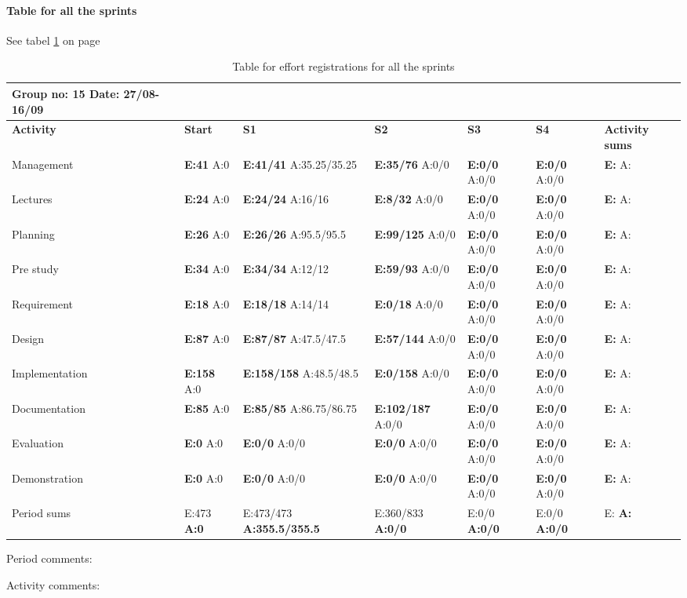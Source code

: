 \paragraph{Table for all the sprints}\hfill

See tabel \ref{tab:effortsprints} on page \pageref{tab:effortsprints}
\begin{table}
\begin{tabularx}{\linewidth}{>{\setlength\hsize{.55\hsize}}X|>{\setlength\hsize{0.2\hsize}}X|>{\setlength\hsize{0.4\hsize}}X|>{\setlength\hsize{0.3\hsize}}X|>{\setlength\hsize{0.3\hsize}}X|>{\setlength\hsize{.3\hsize}}X|>{\setlength\hsize{.2\hsize}}X}
Group no: 15 Date: 27/08-16/09 \\ \hline
\textbf{Activity} & \textbf{Start} & \textbf{S1} & \textbf{S2} & \textbf{S3} & \textbf{S4} & \textbf{Activity sums}\\ \hline \hline
Management & \textbf{E:41} A:0 & \textbf{E:41/41} A:35.25/35.25 & \textbf{E:35/76} A:0/0 & \textbf{E:0/0} A:0/0 & \textbf{E:0/0} A:0/0 & \textbf{E: } A:  \\ \hline
Lectures & \textbf{E:24} A:0 & \textbf{E:24/24} A:16/16 & \textbf{E:8/32} A:0/0 & \textbf{E:0/0} A:0/0 & \textbf{E:0/0} A:0/0 & \textbf{E: } A:  \\ \hline
Planning & \textbf{E:26} A:0 & \textbf{E:26/26} A:95.5/95.5 & \textbf{E:99/125} A:0/0 & \textbf{E:0/0} A:0/0 & \textbf{E:0/0} A:0/0  & \textbf{E: } A:  \\ \hline
Pre study & \textbf{E:34} A:0 & \textbf{E:34/34} A:12/12 & \textbf{E:59/93} A:0/0 & \textbf{E:0/0} A:0/0 & \textbf{E:0/0} A:0/0 & \textbf{E: } A:  \\ \hline
Requirement & \textbf{E:18} A:0 & \textbf{E:18/18} A:14/14 & \textbf{E:0/18} A:0/0 & \textbf{E:0/0} A:0/0 & \textbf{E:0/0} A:0/0 & \textbf{E: } A:  \\ \hline
Design & \textbf{E:87} A:0 & \textbf{E:87/87} A:47.5/47.5 & \textbf{E:57/144} A:0/0 & \textbf{E:0/0} A:0/0 & \textbf{E:0/0} A:0/0 & \textbf{E: } A:  \\ \hline
Implementation & \textbf{E:158} A:0 & \textbf{E:158/158} A:48.5/48.5 & \textbf{E:0/158} A:0/0 & \textbf{E:0/0} A:0/0 & \textbf{E:0/0} A:0/0 & \textbf{E: } A:  \\ \hline
Documentation & \textbf{E:85} A:0 & \textbf{E:85/85} A:86.75/86.75 & \textbf{E:102/187} A:0/0 & \textbf{E:0/0} A:0/0 & \textbf{E:0/0} A:0/0 & \textbf{E: } A:  \\ \hline
Evaluation & \textbf{E:0} A:0 & \textbf{E:0/0} A:0/0 & \textbf{E:0/0} A:0/0 & \textbf{E:0/0} A:0/0 & \textbf{E:0/0} A:0/0 & \textbf{E: } A:  \\ \hline
Demonstration & \textbf{E:0} A:0 & \textbf{E:0/0} A:0/0 & \textbf{E:0/0} A:0/0 & \textbf{E:0/0} A:0/0 & \textbf{E:0/0} A:0/0 & \textbf{E: } A:  \\ \hline
Period sums & E:473 \textbf{A:0} & E:473/473 \textbf{A:355.5/355.5} & E:360/833 \textbf{A:0/0} & E:0/0 \textbf{A:0/0} & E:0/0 \textbf{A:0/0} & E: \textbf{A:}  
\end{tabularx}

Period comments:

Activity comments:
\caption{Table for effort registrations for all the sprints} \label{tab:effortsprints}
\end{table}


